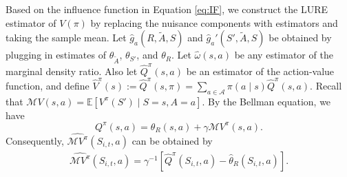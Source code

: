 \documentclass[12pt]{article}
\newcommand{\0}{\boldsymbol{0}}
\newtheorem{remark}{Remark}
\newcommand{\E}{\mathbb{E}}
\begin{document}


Based on the influence function in Equation \eqref{eq:IF}, we construct the LURE estimator of $V(\pi)$ by replacing the nuisance components with estimators and taking the sample mean.
Let $\widehat g_a(R,\widetilde A,S)$ and $\widehat g_a'(S',\widetilde A,S)$ be obtained by plugging in estimates of $\theta_{\widetilde A}$, $\theta_{S'}$, and $\theta_R$.
Let $\widehat\omega(s,a)$ be any estimator of the marginal density ratio. 
Also let $\widehat Q^\pi(s,a)$ be an estimator of the action-value function, and define $\widehat V^\pi(s):=\widehat Q^\pi(s,\pi)=\sum_{a\in\mathcal A}\pi(a\mid s)\widehat Q^\pi(s,a)$.
Recall that ${\mathcal M}V(s,a)=\E[V^\pi(S')\mid S=s,A=a]$. By the Bellman equation, we have
$$Q^\pi(s,a)=\theta_R(s,a)+\gamma \mathcal M V^\pi(s,a).$$
Consequently, $\widehat{\mathcal M V^{\pi}}(S_{i,t},a)$ can be obtained by
\begin{gather*}
    \widehat{\mathcal M V^{\pi}}(S_{i,t},a)= \gamma^{-1} \left[\widehat Q^\pi(S_{i,t},a)-\widehat\theta_R(S_{i,t},a)\right].
\end{gather*}
\end{document}
